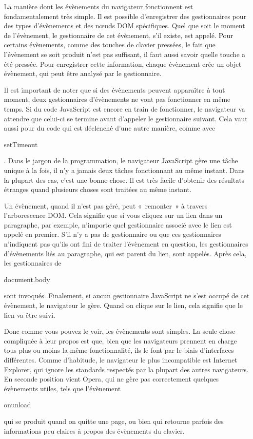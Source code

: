 \documentclass{FramateX}
\renewcommand{\texttt}[1]{\begin{sffamily}{#1}\end{sffamily}}
\begin{document}
La manière dont les évènements du navigateur fonctionnent est
fondamentalement très simple. Il est possible d'enregistrer des
gestionnaires pour des types d'évènements et des nœuds DOM spécifiques.
Quel que soit le moment de l'évènement, le gestionnaire de cet
évènement, s'il existe, est appelé. Pour certains évènements, comme des
touches de clavier pressées, le fait que l'évènement se soit produit
n'est pas suffisant, il faut aussi savoir quelle touche a été pressée.
Pour enregistrer cette information, chaque évènement crée un objet
évènement, qui peut être analysé par le gestionnaire.

Il est important de noter que si des évènements peuvent apparaître à
tout moment, deux gestionnaires d'évènements ne vont pas fonctionner en
même temps. Si du code JavaScript est encore en train de fonctionner, le
navigateur va attendre que celui-ci se termine avant d'appeler le
gestionnaire suivant. Cela vaut aussi pour du code qui est déclenché
d'une autre manière, comme avec \texttt{setTimeout}. Dans le jargon de
la programmation, le navigateur JavaScript gère une tâche unique à la
fois, il n'y a jamais deux tâches fonctionnant au même instant. Dans la
plupart des cas, c'est une bonne chose. Il est très facile d'obtenir des
résultats étranges quand plusieurs choses sont traitées au même instant.

Un évènement, quand il n'est pas géré, peut «~remonter~» à travers
l'arborescence DOM. Cela signifie que si vous cliquez sur un lien dans
un paragraphe, par exemple, n'importe quel gestionnaire associé avec le
lien est appelé en premier. S'il n'y a pas de gestionnaire ou que ces
gestionnaires n'indiquent pas qu'ils ont fini de traiter l'évènement en
question, les gestionnaires d'évènements liés au paragraphe, qui est
parent du lien, sont appelés. Après cela, les gestionnaires de
\texttt{document.body} sont invoqués. Finalement, si aucun gestionnaire
JavaScript ne s'est occupé de cet évènement, le navigateur le gère.
Quand on clique sur le lien, cela signifie que le lien va être suivi.

\begin{center}\end{center}

Donc comme vous pouvez le voir, les évènements sont simples. La seule
chose compliquée à leur propos est que, bien que les navigateurs
prennent en charge tous plus ou moins la même fonctionnalité, ils le
font par le biais d'interfaces différentes. Comme d'habitude, le
navigateur le plus incompatible est Internet Explorer, qui ignore les
standards respectés par la plupart des autres navigateurs. En seconde
position vient Opera, qui ne gère pas correctement quelques évènements
utiles, tels que l'évènement \texttt{onunload} qui se produit quand on
quitte une page, ou bien qui retourne parfois des informations peu
claires à propos des évènements du clavier.
\end{document}
